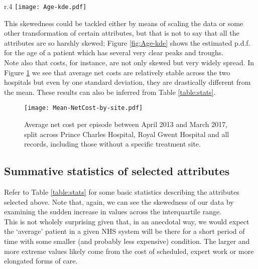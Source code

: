 \documentclass{article}
\begin{document}
\begin{wrapfigure}{r}{.4\textwidth}
	\centering
	\texttt{[image: Age-kde.pdf]}
	\caption{Estimated p.d.f. for age.}
	\label{fig:Age-kde}
\end{wrapfigure}

This skewedness could be tackled either by means of scaling the data or some
other transformation of certain attributes, but that is not to say that 
all the attributes are so harshly skewed; Figure \ref{fig:Age-kde} shows the
estimated p.d.f. for the age of a patient which has several very clear peaks and
troughs. \\

Note also that costs, for instance, are not only skewed but very widely spread.
In Figure \ref{fig:mean-cost-by-site} we see that average net costs are 
relatively stable across the two hospitals but even by one standard deviation, 
they are drastically different from the mean. These results can also be inferred
from Table \ref{table:stats}.

\begin{figure}[h]\label{fig:mean-cost-by-site}
	\centering
	\texttt{[image: Mean-NetCost-by-site.pdf]}
	\caption{Average net cost per episode between April 2013 and March 2017, 
	split across Prince Charles Hospital, Royal Gwent Hospital and all 
	records, including those without a specific treatment site.}
\end{figure}


\subsection{Summative statistics of selected attributes}
\label{subsection:summative}

Refer to Table \ref{table:stats} for some basic statistics describing the 
attributes selected above. Note that, again, we can see the skewedness of our 
data by examining the sudden increase in values across the interquartile range. 
\\

This is not wholely surprising given that, in an anecdotal way, we would expect 
the `average' patient in a given NHS system will be there for a short period of 
time with some smaller (and probably less expensive) condition. The larger and 
more extreme values likely come from the cost of scheduled, expert work or more 
elongated forms of care.
\end{document}

